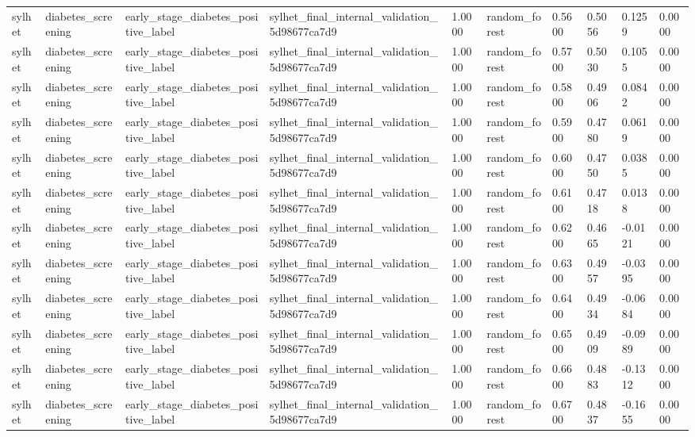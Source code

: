 \begin{tabular}{llllllllll}
sylhet & diabetes\_screening & early\_stage\_diabetes\_positive\_label & sylhet\_final\_internal\_validation\_5d98677ca7d9 & 1.0000 & random\_forest & 0.5600 & 0.5056 & 0.1259 & 0.0000 \\
sylhet & diabetes\_screening & early\_stage\_diabetes\_positive\_label & sylhet\_final\_internal\_validation\_5d98677ca7d9 & 1.0000 & random\_forest & 0.5700 & 0.5030 & 0.1055 & 0.0000 \\
sylhet & diabetes\_screening & early\_stage\_diabetes\_positive\_label & sylhet\_final\_internal\_validation\_5d98677ca7d9 & 1.0000 & random\_forest & 0.5800 & 0.4906 & 0.0842 & 0.0000 \\
sylhet & diabetes\_screening & early\_stage\_diabetes\_positive\_label & sylhet\_final\_internal\_validation\_5d98677ca7d9 & 1.0000 & random\_forest & 0.5900 & 0.4780 & 0.0619 & 0.0000 \\
sylhet & diabetes\_screening & early\_stage\_diabetes\_positive\_label & sylhet\_final\_internal\_validation\_5d98677ca7d9 & 1.0000 & random\_forest & 0.6000 & 0.4750 & 0.0385 & 0.0000 \\
sylhet & diabetes\_screening & early\_stage\_diabetes\_positive\_label & sylhet\_final\_internal\_validation\_5d98677ca7d9 & 1.0000 & random\_forest & 0.6100 & 0.4718 & 0.0138 & 0.0000 \\
sylhet & diabetes\_screening & early\_stage\_diabetes\_positive\_label & sylhet\_final\_internal\_validation\_5d98677ca7d9 & 1.0000 & random\_forest & 0.6200 & 0.4665 & -0.0121 & 0.0000 \\
sylhet & diabetes\_screening & early\_stage\_diabetes\_positive\_label & sylhet\_final\_internal\_validation\_5d98677ca7d9 & 1.0000 & random\_forest & 0.6300 & 0.4957 & -0.0395 & 0.0000 \\
sylhet & diabetes\_screening & early\_stage\_diabetes\_positive\_label & sylhet\_final\_internal\_validation\_5d98677ca7d9 & 1.0000 & random\_forest & 0.6400 & 0.4934 & -0.0684 & 0.0000 \\
sylhet & diabetes\_screening & early\_stage\_diabetes\_positive\_label & sylhet\_final\_internal\_validation\_5d98677ca7d9 & 1.0000 & random\_forest & 0.6500 & 0.4909 & -0.0989 & 0.0000 \\
sylhet & diabetes\_screening & early\_stage\_diabetes\_positive\_label & sylhet\_final\_internal\_validation\_5d98677ca7d9 & 1.0000 & random\_forest & 0.6600 & 0.4883 & -0.1312 & 0.0000 \\
sylhet & diabetes\_screening & early\_stage\_diabetes\_positive\_label & sylhet\_final\_internal\_validation\_5d98677ca7d9 & 1.0000 & random\_forest & 0.6700 & 0.4837 & -0.1655 & 0.0000 \\

\end{tabular}
